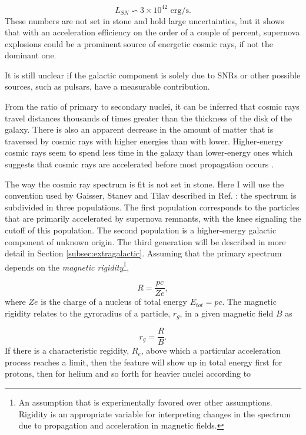 \begin{equation}
L_{SN} \backsim 3 \times 10^{42} \textrm{ erg/s}.
\end{equation}
These numbers are not set in stone and hold large uncertainties, but it shows that with an acceleration efficiency on the order of a couple of percent, supernova explosions could be a prominent source of energetic cosmic rays, if not the dominant one.

It is still unclear if the galactic component is solely due to SNRs or other possible sources, such as pulsars, have a measurable contribution.

From the ratio of primary to secondary nuclei, it can be inferred that cosmic rays travel distances thousands of times greater than the thickness of the disk of the galaxy. There is also an apparent decrease in the amount of matter that is traversed by cosmic rays with higher energies than with lower. Higher-energy cosmic rays seem to spend less time in the galaxy than lower-energy ones which suggests that cosmic rays are accelerated before most propagation occurs \cite{Gaisser:2016uoy}.

The way the cosmic ray spectrum is fit is not set in stone. Here I will use the convention used by Gaisser, Stanev and Tilav described in Ref. \cite{Gaisser:2013bla}: the spectrum is subdivided in three populations. The first population corresponds to the particles that are primarily accelerated by supernova remnants, with the knee signaling the cutoff of this population. The second population is a higher-energy galactic component of unknown origin. The third generation will be described in more detail in Section \ref{subsec:extragalactic}. Assuming that the primary spectrum depends on the \textit{magnetic rigidity}\footnote{An assumption that is experimentally favored over other assumptions. Rigidity is an appropriate variable for interpreting changes in the spectrum due to propagation and acceleration in magnetic fields.},

\begin{equation}
R = \frac{pc}{Ze},
\end{equation}
where $Ze$ is the charge of a nucleus of total energy $E_{tot} = pc$. The magnetic rigidity relates to the gyroradius of a particle, $r_g$, in a given magnetic field $B$ as

\begin{equation}
\label{eq:gyro}
r_g = \frac{R}{B}.
\end{equation}
If there is a characteristic regidity, $R_e$, above which a particular acceleration process reaches a limit, then the feature will show up in total energy first for protons, then for helium and so forth for heavier nuclei according to


